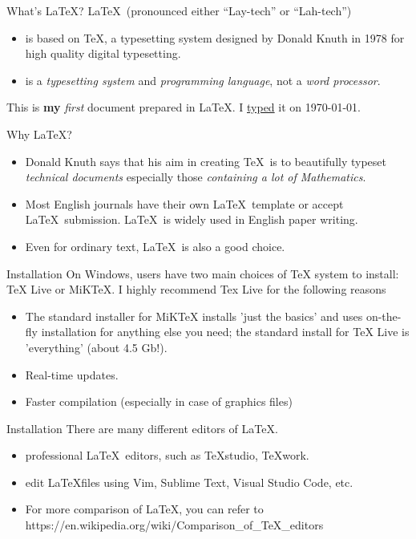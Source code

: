 \documentclass[11pt]{beamer}
\begin{document}
\begin{CJK*}{UTF8}{gkai}
\begin{frame}[fragile]{What's \LaTeX?}
\LaTeX\ (pronounced either “Lay-tech” or “Lah-tech”) 
	\begin{itemize}
		\item is based on \TeX, a typesetting system designed by Donald Knuth in 1978 for high quality digital typesetting.
		\item is a \textit{typesetting system} and \textit{programming language}, not a \textit{word processor}.
	\end{itemize}

\vskip 0.25cm
\begin{codeshow}
This is \textbf{my} \emph{first} document prepared in \LaTeX. I \underline{typed} it on \today.
\end{codeshow} 
\end{frame}



\begin{frame}{Why \LaTeX?}
\begin{itemize}
	\item Donald Knuth says that his aim in creating \TeX\ is to beautifully
	typeset \textit{technical documents} especially those \textit{containing a lot of Mathematics}.
	\item Most English journals have their own \LaTeX\ template or accept \LaTeX\ submission. \LaTeX\ is widely used in English paper writing. 
	\item Even for ordinary text, \LaTeX\ is also a good choice.
\end{itemize}
\end{frame}

\begin{frame}{Installation}
	On Windows, users have two main choices of TeX system to install: \alert{TeX Live} or \alert{MiKTeX}. I highly recommend Tex Live for the following reasons
	\begin{itemize}
		\item The standard installer for MiKTeX installs 'just the basics' and uses on-the-fly installation for anything else you need; the standard install for TeX Live is 'everything' (about 4.5 Gb!).
		\item Real-time updates.
		\item Faster compilation (especially in case of graphics files)
	\end{itemize}
\end{frame}

\begin{frame}{Installation}
There are many different editors of \LaTeX.
\begin{itemize}
\item professional \LaTeX\ editors, such as TeXstudio, TeXwork.
\item edit \LaTeX files using Vim, Sublime Text, Visual Studio Code, etc.
\item For more comparison of \LaTeX, you can refer to https://en.wikipedia.org/wiki/Comparison\_of\_TeX\_editors
\end{itemize}
 \vskip 0.75cm


\end{frame}
\end{CJK*}
\end{document}
